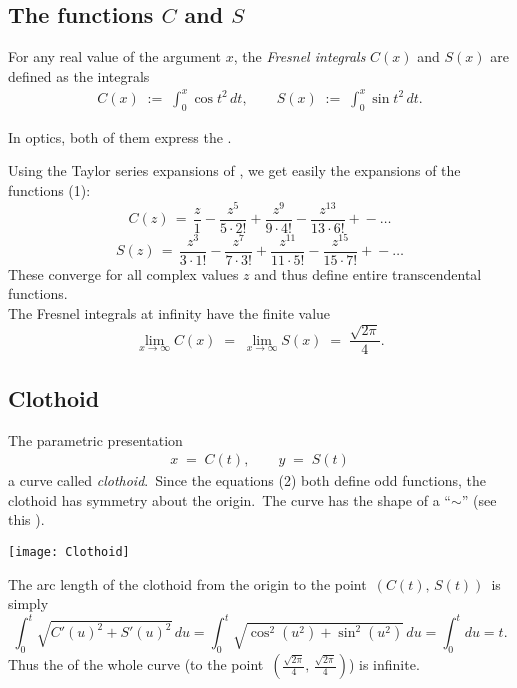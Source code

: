 \documentclass[12pt]{article}
\theoremstyle{definition}
\begin{document}

\subsection{The functions $C$ and $S$}

For any real value of the argument $x$, the {\em Fresnel integrals} $C(x)$ and $S(x)$ are defined as the integrals
\begin{align}
C(x) \;:=\; \int_0^x\cos{t^2}\,dt, \quad\quad
S(x) \;:=\; \int_0^x\sin{t^2}\,dt.
\end{align}

In optics, both of them express the .

Using the Taylor series expansions of , we get easily the expansions of the functions (1):
$$C(z) \,=\, \frac{z}{1}\!-\!\frac{z^5}{5\!\cdot\!2!}\!
+\!\frac{z^9}{9\!\cdot\!4!}\!-\!\frac{z^{13}}{13\!\cdot\!6!}\!+\!-\ldots$$
$$S(z) \,=\, \frac{z^3}{3\cdot1!}\!-\!\frac{z^7}{7\!\cdot\!3!}\!
+\!\frac{z^{11}}{11\!\cdot\!5!}\!-\!\frac{z^{15}}{15\!\cdot\!7!}\!+\!-\ldots$$
These converge for all complex values $z$ and thus define entire transcendental functions.\\

The Fresnel integrals at infinity have the finite value
$$\lim_{x\to\infty}C(x) \;=\; \lim_{x\to\infty}S(x) \;=\; \frac{\sqrt{2\pi}}{4}.$$

\subsection{Clothoid}

The parametric presentation 
\begin{align}
x \;=\; C(t), \quad\quad y \;=\; S(t)
\end{align}
 a curve called {\em clothoid}.\, Since the equations (2) both define odd functions, the clothoid has symmetry about the origin.\, The curve has the shape of a ``$\sim$''
(see this ).

\begin{center}
\texttt{[image: Clothoid]}
\end{center}

The arc length of the clothoid from the origin to the point \,$(C(t),\,S(t))$\, is simply
$$\int_0^t\sqrt{C'(u)^2+S'(u)^2}\,du = \int_0^t\sqrt{\cos^2(u^2)+\sin^2(u^2)}\,du = \int_0^tdu = t.$$
Thus the  of the whole curve (to the point\, 
$(\frac{\sqrt{2\pi}}{4},\,\frac{\sqrt{2\pi}}{4})$) is infinite.
\end{document}
